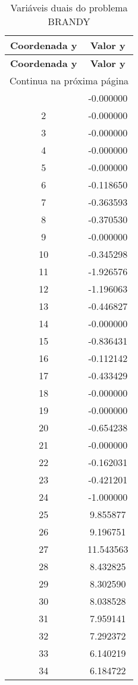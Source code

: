 \documentclass[12pt]{article}
\begin{document}
\begin{longtable}{@{}cc@{}}
\caption{Variáveis duais do problema BRANDY} \\
\toprule
\textbf{Coordenada y} & \textbf{Valor y} \\
\midrule
\endfirsthead

\toprule
\textbf{Coordenada y} & \textbf{Valor y} \\
\midrule
\endhead

\midrule \multicolumn{2}{r}{{Continua na próxima página}} \\ \midrule
\endfoot

\bottomrule
\endlastfoot
1 & -0.000000 \\
2 & -0.000000 \\
3 & -0.000000 \\
4 & -0.000000 \\
5 & -0.000000 \\
6 & -0.118650 \\
7 & -0.363593 \\
8 & -0.370530 \\
9 & -0.000000 \\
10 & -0.345298 \\
11 & -1.926576 \\
12 & -1.196063 \\
13 & -0.446827 \\
14 & -0.000000 \\
15 & -0.836431 \\
16 & -0.112142 \\
17 & -0.433429 \\
18 & -0.000000 \\
19 & -0.000000 \\
20 & -0.654238 \\
21 & -0.000000 \\
22 & -0.162031 \\
23 & -0.421201 \\
24 & -1.000000 \\
25 & 9.855877 \\
26 & 9.196751 \\
27 & 11.543563 \\
28 & 8.432825 \\
29 & 8.302590 \\
30 & 8.038528 \\
31 & 7.959141 \\
32 & 7.292372 \\
33 & 6.140219 \\
34 & 6.184722 \\

\end{longtable}
\end{document}
